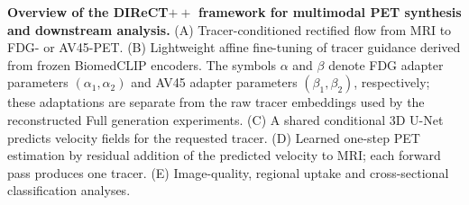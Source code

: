 \caption{\textbf{Overview of the DIReCT$++$ framework for multimodal PET synthesis and downstream analysis.}
(A) Tracer-conditioned rectified flow from MRI to FDG- or AV45-PET. (B) Lightweight affine fine-tuning of tracer guidance derived from frozen BiomedCLIP encoders. The symbols $\alpha$ and $\beta$ denote FDG adapter parameters $(\alpha_1,\alpha_2)$ and AV45 adapter parameters $(\beta_1,\beta_2)$, respectively; these adaptations are separate from the raw tracer embeddings used by the reconstructed Full generation experiments. (C) A shared conditional 3D U-Net predicts velocity fields for the requested tracer. (D) Learned one-step PET estimation by residual addition of the predicted velocity to MRI; each forward pass produces one tracer. (E) Image-quality, regional uptake and cross-sectional classification analyses.}
    \label{fig:1}
